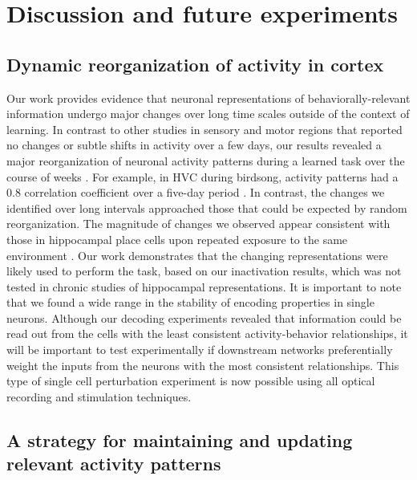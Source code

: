 \chapter{Discussion and future experiments} \label{chapter_5}

\section{Dynamic reorganization of activity in cortex} \label{discussion:general}

Our work provides evidence that neuronal representations of behaviorally-relevant information undergo major changes over long time scales outside of the context of learning. In contrast to other studies in sensory and motor regions that reported no changes or subtle shifts in activity over a few days, our results revealed a major reorganization of neuronal activity patterns during a learned task over the course of weeks \citep{Margolis2012, Peron2015, Peters2014}. For example, in HVC during birdsong, activity patterns had a 0.8 correlation coefficient over a five-day period \citep{Liberti2016}. In contrast, the changes we identified over long intervals approached those that could be expected by random reorganization. The magnitude of changes we observed appear consistent with those in hippocampal place cells upon repeated exposure to the same environment \citep{Ziv2013}. Our work demonstrates that the changing representations were likely used to perform the task, based on our inactivation results, which was not tested in chronic studies of hippocampal representations. It is important to note that we found a wide range in the stability of encoding properties in single neurons. Although our decoding experiments revealed that information could be read out from the cells with the least consistent activity-behavior relationships, it will be important to test experimentally if downstream networks preferentially weight the inputs from the neurons with the most consistent relationships. This type of single cell perturbation experiment is now possible using all optical recording and stimulation techniques.

\section{A strategy for maintaining and updating relevant activity patterns} \label{discussion:utility_argument}

